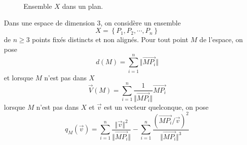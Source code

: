 \begin{figure}
	\begin{center}
	
	\end{center}
\caption{Ensemble $X$ dans un plan.}
\end{figure} 

Dans une espace de dimension 3, on considère un ensemble 
\begin{displaymath}
X = \left\lbrace P_1, P_2, \cdots ,P_n \right\rbrace  
\end{displaymath}
de $n\geq 3$ points fixés distincts et non alignés.\newline
Pour tout point $M$ de l'espace, on pose
\begin{displaymath}
 d(M) = \sum _{i=1}^{n} \Vert \overrightarrow{MP_i} \Vert
\end{displaymath}
et lorsque $M$ n'est pas dans $X$
\begin{displaymath}
 \overrightarrow{V}(M) = \sum _{i=1}^{n} \frac{1}{\Vert \overrightarrow{MP_i} \Vert} \overrightarrow{MP_i}
\end{displaymath}
lorsque $M$ n'est pas dans $X$ et $\overrightarrow v$ est un vecteur quelconque, on pose
\begin{displaymath}
 q_M(\overrightarrow v) =
 \sum _{i=1}^{n} \frac{\Vert \overrightarrow v\Vert ^2}{\Vert \overrightarrow{MP_i} \Vert} -
 \sum _{i=1}^{n} \frac{(\overrightarrow{MP_i} / \overrightarrow v)^2}{\Vert \overrightarrow{MP_i} \Vert ^3} 
\end{displaymath}


